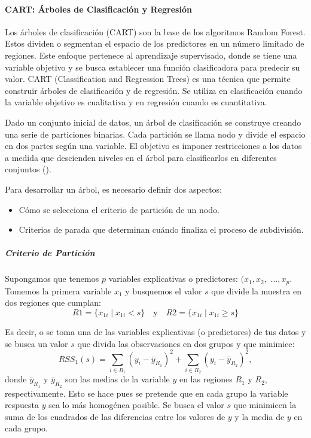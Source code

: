 \paragraph{CART: Árboles de Clasificación y Regresión}
Los árboles de clasificación (CART) son la base de los algoritmos Random Forest. Estos dividen o segmentan el espacio de los predictores en un número limitado de regiones. Este enfoque pertenece al aprendizaje supervisado, donde se tiene una variable objetivo y se busca establecer una función clasificadora para predecir su valor. CART (Classification and Regression Trees) es una técnica que permite construir árboles de clasificación y de regresión. Se utiliza en clasificación cuando la variable objetivo es cualitativa y en regresión cuando es cuantitativa.

Dado un conjunto inicial de datos, un árbol de clasificación se construye creando una serie de particiones binarias. Cada partición se llama nodo y divide el espacio en dos partes según una variable. El objetivo es imponer restricciones a los datos a medida que descienden niveles en el árbol para clasificarlos en diferentes conjuntos (\cite{wu2008top}).

Para desarrollar un árbol, es necesario definir dos aspectos:
\begin{itemize}
	\item Cómo se selecciona el criterio de partición de un nodo.
	\item Criterios de parada que determinan cuándo finaliza el proceso de subdivisión.
\end{itemize}


\subparagraph{Criterio de Partición}
Supongamos que tenemos \(p\) variables explicativas o predictores: $(x_1, x_2,$ $\ldots, x_p$. Tomemos la primera variable \(x_1\) y busquemos el valor \(s\) que divide la muestra en dos regiones que cumplan:
\[
R1 = \{x_{1i} \mid x_{1i} < s\} \quad \text{y} \quad R2 = \{x_{1i} \mid x_{1i} \geq s\}
\]

Es decir, o se toma una de las variables explicativas (o predictores) de tus datos y se busca un valor $s$ que divida las observaciones en dos grupos y que minimice:
\[
RSS_1(s) = \sum_{i \in R_1} (y_i - \bar{y}_{R_1})^2 + \sum_{i \in R_2} (y_i - \bar{y}_{R_2})^2,
\]
donde \(\bar{y}_{R_1}\) y \(\bar{y}_{R_2}\) son las medias de la variable \(y\) en las regiones \(R_1\) y \(R_2\), respectivamente. Esto se hace pues se pretende que en cada grupo la variable respuesta \(y\) sea lo más homogénea posible. Se busca el valor $s$ que minimicen la suma de los cuadrados de las diferencias entre los valores de $y$ y la media de $y$ en cada grupo.

